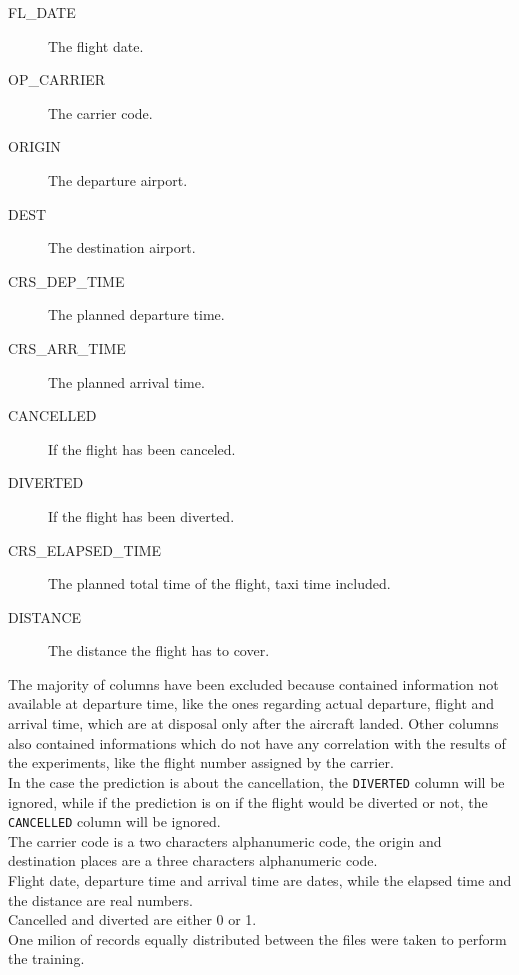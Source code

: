 \documentclass[
	letterpaper, %
	10pt, %
]{class}
\begin{document}
\begin{description}
    \item[FL\_DATE] The flight date.
    \item[OP\_CARRIER] The carrier code.
    \item[ORIGIN] The departure airport.
    \item[DEST] The destination airport.
    \item[CRS\_DEP\_TIME] The planned departure time.
    \item[CRS\_ARR\_TIME] The planned arrival time.
    \item[CANCELLED] If the flight has been canceled.
    \item[DIVERTED] If the flight has been diverted.
    \item[CRS\_ELAPSED\_TIME] The planned total time of the flight, taxi time included.
    \item[DISTANCE] The distance the flight has to cover.\\
\end{description}

The majority of columns have been excluded because contained information not available at departure time, like the ones regarding actual departure, flight and arrival time, which are at disposal only after the aircraft landed.
Other columns also contained informations which do not have any correlation with the results of the experiments, like the flight number assigned by the carrier.\\

In the case the prediction is about the cancellation, the \texttt{DIVERTED} column will be ignored, while if the prediction is on if the flight would be diverted or not, the \texttt{CANCELLED} column will be ignored.\\

The carrier code is a two characters alphanumeric code, the origin and destination places are a three characters alphanumeric code.\\
Flight date, departure time and arrival time are dates, while the elapsed time and the distance are real numbers.\\
Cancelled and diverted are either 0 or 1.\\

One milion of records equally distributed between the files were taken to perform the training.

\end{document}
